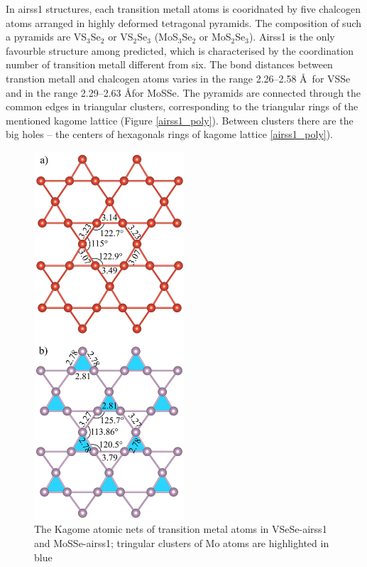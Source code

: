 \documentclass[a4paperm]{article}
\begin{document}
In airss1 structures, each transition metall atoms is cooridnated by five chalcogen atoms arranged in highly deformed tetragonal pyramids.
The composition of such a pyramids are VS$_3$Se$_2$ or VS$_2$Se$_3$ (MoS$_3$Se$_2$ or MoS$_2$Se$_3$).
Airss1 is the only favourble structure among predicted, which is characterised by the coordination number of transition metall different from six.
The bond distances between transtion metall and chalcogen atoms varies in the range 2.26--2.58 \AA\ for VSSe and in the range 2.29--2.63 \AA for MoSSe.
The pyramids are connected through the common edges in triangular clusters, corresponding to the triangular rings of the mentioned kagome lattice (Figure \ref{airss1_poly}).
Between clusters there are the big holes -- the centers of hexagonals rings of kagome lattice \ref{airss1_poly}).



\begin{figure}
	\includegraphics [width=0.5\textwidth]{airss1_tm.png}
	\caption{The Kagome atomic nets of transition metal atoms in VSeSe-airss1 and MoSSe-airss1; tringular clusters of Mo atoms are highlighted in blue} 
\label{airss1_tm}
\end{figure}
\end{document}
